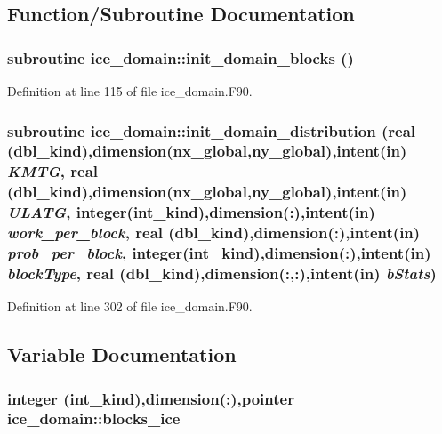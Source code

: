 \subsection{Function/Subroutine Documentation}
\hypertarget{namespaceice__domain_a110521a564e05165f28b634bd881455c}{
\subsubsection[{init\_\-domain\_\-blocks}]{\setlength{\rightskip}{0pt plus 5cm}subroutine ice\_\-domain::init\_\-domain\_\-blocks ()}}
\label{namespaceice__domain_a110521a564e05165f28b634bd881455c}


Definition at line 115 of file ice\_\-domain.F90.\hypertarget{namespaceice__domain_a1beac4cd1574f731cb07cd1f7d20f724}{
\subsubsection[{init\_\-domain\_\-distribution}]{\setlength{\rightskip}{0pt plus 5cm}subroutine ice\_\-domain::init\_\-domain\_\-distribution (real (dbl\_\-kind),dimension(nx\_\-global,ny\_\-global),intent(in) {\em KMTG}, \/  real (dbl\_\-kind),dimension(nx\_\-global,ny\_\-global),intent(in) {\em ULATG}, \/  integer(int\_\-kind),dimension(:),intent(in) {\em work\_\-per\_\-block}, \/  real (dbl\_\-kind),dimension(:),intent(in) {\em prob\_\-per\_\-block}, \/  integer(int\_\-kind),dimension(:),intent(in) {\em blockType}, \/  real (dbl\_\-kind),dimension(:,:),intent(in) {\em bStats})}}
\label{namespaceice__domain_a1beac4cd1574f731cb07cd1f7d20f724}


Definition at line 302 of file ice\_\-domain.F90.

\subsection{Variable Documentation}
\hypertarget{namespaceice__domain_a152cf5087ce1dccce8f5e147306320ae}{
\subsubsection[{blocks\_\-ice}]{\setlength{\rightskip}{0pt plus 5cm}integer (int\_\-kind),dimension(:),pointer {\bf ice\_\-domain::blocks\_\-ice}}}
\label{namespaceice__domain_a152cf5087ce1dccce8f5e147306320ae}


